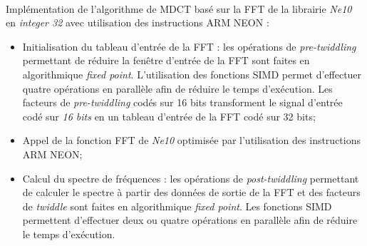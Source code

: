 \documentclass{article}
\begin{document}
\paragraph{}
Implémentation de l'algorithme de MDCT basé sur la FFT de la librairie \emph{Ne10} en \emph{integer 32} avec utilisation des instructions ARM NEON :
\begin{itemize}
    \item Initialisation du tableau d'entrée de la FFT : les opérations de \emph{pre-twiddling} permettant de réduire la fenêtre d'entrée de la FFT sont faites en algorithmique \emph{fixed point}. L'utilisation des fonctions SIMD permet d'effectuer quatre opérations en parallèle afin de réduire le temps d'exécution. Les facteurs de \emph{pre-twiddling} codés sur 16 bits transforment le signal d'entrée codé sur \emph{16 bits} en un tableau d'entrée de la FFT codé sur 32 bits;
    \item Appel de la fonction FFT de \emph{Ne10} optimisée par l'utilisation des instructions ARM NEON;
    \item Calcul du spectre de fréquences : les opérations de \emph{post-twiddling} permettant de calculer le spectre à partir des données de sortie de la FFT et des facteurs de \emph{twiddle} sont faites en algorithmique \emph{fixed point}. Les fonctions SIMD permettent d'effectuer deux ou quatre opérations en parallèle afin de réduire le temps d'exécution.
\end{itemize}
\lstset{language=C++}
\newpage
\end{document}
